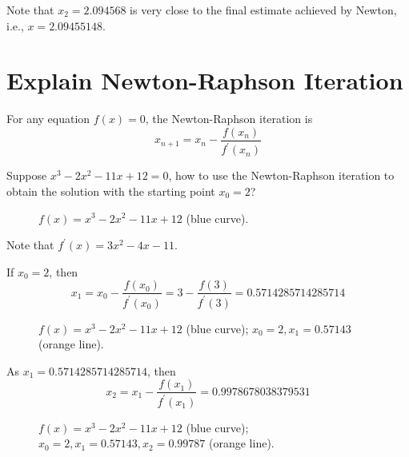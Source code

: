 \documentclass[12pt]{article}
\begin{document}
Note that $x_2=2.094568$ is very close to the final estimate achieved by Newton, i.e., $x=2.09455148$.

\clearpage

\section{Explain Newton-Raphson Iteration}

For any equation $f(x)=0$, the Newton-Raphson iteration is
\begin{equation*}
x_{n+1}=x_{n}-\frac{f(x_{n})}{f^\prime(x_{n})}
\end{equation*}

Suppose $x^3-2x^2-11x+12=0$, how to use the Newton-Raphson iteration to obtain the solution with the starting point $x_0=2$?

\begin{figure}[h]
    \centering
    
    \caption{{\color{blue}$f(x)=x^3-2x^2-11x+12$} (blue curve).}
\end{figure}

Note that $f^\prime(x)=3x^2-4x-11$.

If $x_0=2$, then
\begin{equation*}
x_1=x_{0}-\frac{f(x_{0})}{f^\prime(x_{0})}=3-\frac{f(3)}{f^\prime(3)}=0.5714285714285714
\end{equation*}

\begin{figure}[h]
    \centering
    
    \caption{{\color{blue}$f(x)=x^3-2x^2-11x+12$} (blue curve); {\color{orange}$x_0=2,x_1=0.57143$} (orange line).}
\end{figure}

\clearpage

As $x_1=0.5714285714285714$, then
\begin{equation*}
x_2=x_{1}-\frac{f(x_{1})}{f^\prime(x_{1})}=0.9978678038379531
\end{equation*}

\begin{figure}[h]
    \centering
    
    \caption{{\color{blue}$f(x)=x^3-2x^2-11x+12$} (blue curve); {\color{orange}$x_0=2,x_1=0.57143,x_2=0.99787$} (orange line).}
\end{figure}
\end{document}
